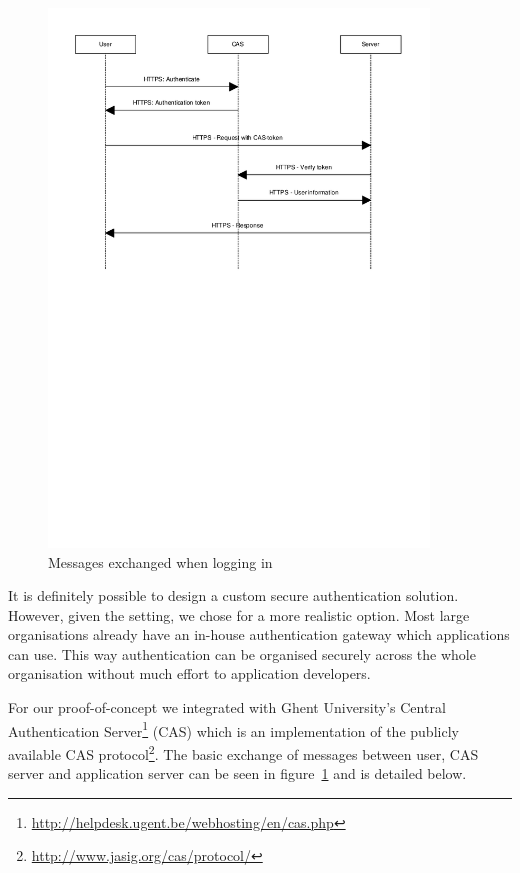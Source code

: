 \documentclass[12pt]{article}
\begin{document}
\begin{figure}[ht]
  \begin{center}
  \includegraphics[width=0.9\textwidth]{images/login.pdf}
  \caption{Messages exchanged when logging in}
  \label{fig:login}
  \end{center}
\end{figure}

It is definitely possible to design a custom secure authentication solution.
However, given the setting, we chose for a more realistic option. Most large
organisations already have an in-house authentication gateway which applications
can use. This way authentication can be organised securely across the whole
organisation without much effort to application developers.

For our proof-of-concept we integrated with Ghent University's Central
Authentication
Server\footnote{\url{http://helpdesk.ugent.be/webhosting/en/cas.php}} (CAS)
which is an implementation of the publicly available CAS
protocol\footnote{\url{http://www.jasig.org/cas/protocol/}}. The basic exchange
of messages between user, CAS server and application server can be seen in
figure~\ref{fig:login} and is detailed below.
\end{document}
